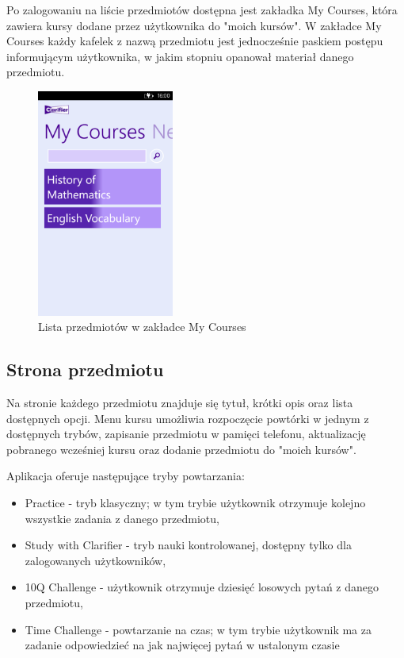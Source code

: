 \documentclass{pracamgr}
\begin{document}
Po zalogowaniu na liście przedmiotów dostępna jest zakładka My Courses, która zawiera kursy dodane przez użytkownika do "moich kursów". W zakładce My Courses każdy kafelek z nazwą przedmiotu jest jednocześnie paskiem postępu informującym użytkownika, w jakim stopniu opanował materiał danego przedmiotu. 

\begin{figure}[t!]
    \centering
    \includegraphics[width=0.4\textwidth]{Progress.png}
    \caption{Lista przedmiotów w zakładce My Courses}
    \label{fig:progress}
\end{figure}

\subsection{Strona przedmiotu}
Na stronie każdego przedmiotu znajduje się tytuł, krótki opis oraz lista dostępnych opcji. Menu kursu umożliwia rozpoczęcie powtórki w jednym z dostępnych trybów, zapisanie przedmiotu w pamięci telefonu, aktualizację pobranego wcześniej kursu oraz dodanie przedmiotu do "moich kursów".

Aplikacja oferuje następujące tryby powtarzania:
\begin{itemize}
\item Practice - tryb klasyczny; w tym trybie użytkownik otrzymuje kolejno wszystkie zadania z danego przedmiotu,
\item Study with Clarifier - tryb nauki kontrolowanej, dostępny tylko dla zalogowanych użytkowników,
\item 10Q Challenge - użytkownik otrzymuje dziesięć losowych pytań z danego przedmiotu,
\item Time Challenge - powtarzanie na czas; w tym trybie użytkownik ma za zadanie odpowiedzieć na jak najwięcej pytań w ustalonym czasie
\end{itemize}
\end{document}
